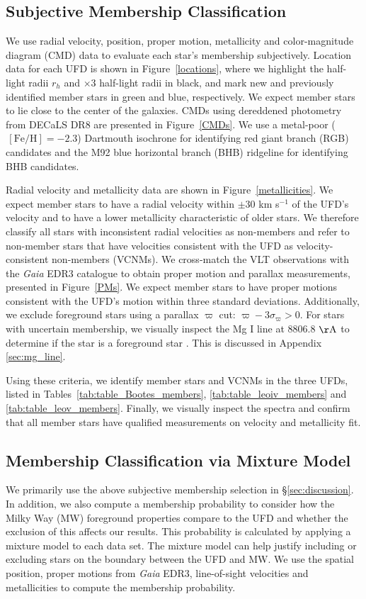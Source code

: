 \documentclass[twocolumn]{aastex63}
\newcommand{\unit}[1]{\ensuremath{\mathrm{\,#1}}\xspace}
\newcommand{\feh}{\unit{[Fe/H]}}
\begin{document}
\subsection{Subjective Membership Classification}
We use radial velocity, position, proper motion, metallicity and color-magnitude diagram (CMD) data to evaluate each star's membership subjectively. Location data for each UFD is shown in Figure~\ref{locations}, where we highlight the half-light radii $r_h$ and $\times$3 half-light radii in black, and mark new and previously identified member stars in green and blue, respectively. We expect member stars to lie close to the center of the galaxies. CMDs using dereddened photometry from DECaLS DR8 are presented in Figure~\ref{CMDs}. 
We use a metal-poor ($\feh = -2.3$) Dartmouth isochrone for identifying red giant branch (RGB) candidates and the M92 blue horizontal branch (BHB) ridgeline for identifying BHB candidates. 

Radial velocity and metallicity data are shown in Figure~\ref{metallicities}. We expect member stars to have a radial velocity within $\pm$30 km s$^{-1}$ of the UFD's velocity and to have a lower metallicity characteristic of older stars. We therefore classify all stars with inconsistent radial velocities as non-members and refer to non-member stars that have velocities consistent with the UFD as velocity-consistent non-members (VCNMs). We cross-match the VLT observations with the {\it Gaia} EDR3 catalogue to obtain proper motion and parallax measurements, presented in Figure~\ref{PMs}. We expect member stars to have proper motions consistent with the UFD's motion within three standard deviations. Additionally, we exclude foreground stars using a parallax $\varpi$ cut: $\varpi - 3\sigma_{\varpi}>0$. For stars with uncertain membership, we visually inspect the Mg I line at 8806.8 $\rm\AA$ to determine if the star is a foreground star \citep{bat2011}. This is discussed in Appendix \ref{sec:mg_line}. 

Using these criteria, we identify member stars and VCNMs in the three UFDs, listed in Tables~\ref{tab:table_Bootes_members}, \ref{tab:table_leoiv_members} and \ref{tab:table_leov_members}. Finally, we visually inspect the spectra and confirm that all member stars have qualified measurements on velocity and metallicity fit.  

\subsection{Membership Classification via Mixture Model}
\label{sec:mixturemodel}
We primarily use the above subjective membership selection in \S\ref{sec:discussion}. In addition, we also compute a membership probability to consider how the Milky Way (MW) foreground properties compare to the UFD and whether the exclusion of this affects our results. This probability is calculated by applying a mixture model to each data set.  The mixture model can help justify including or excluding stars on the boundary between the UFD and MW.
We use the spatial position, proper motions from {\it Gaia} EDR3, line-of-sight velocities and metallicities to compute the membership probability.
\end{document}
